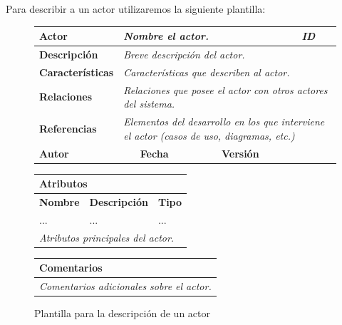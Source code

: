 \documentclass[12pt,spanish]{article}
\begin{document}
Para describir a un actor utilizaremos la siguiente plantilla: 
\begin{figure}[H]
\centering
\begin{tabular}{|m{3cm}|m{4cm}|m{2cm}|m{2cm}|m{2cm}|m{1cm}|}
\hline
\textbf{Actor} &  \multicolumn{4}{m{8cm}|}{\textit{Nombre el actor.}} &  \cellcolor{gray!40}\textit{ID} \\
\hline
\textbf{Descripción} & \multicolumn{5}{m{8cm}|}{\textit{Breve descripción del actor.}} \\
\hline
\textbf{Características} & \multicolumn{5}{m{8cm}|}{\textit{Características que describen al actor.}} \\
\hline
\textbf{Relaciones} &\multicolumn{5}{m{8cm}|}{\textit{Relaciones que posee el actor con otros actores del sistema.}} \\
\hline
\textbf{Referencias} & \multicolumn{5}{m{8cm}|}{\textit{Elementos del desarrollo en los que interviene el actor (casos de uso, diagramas, etc.)}} \\
\hline
\textbf{Autor} &  & \textbf{Fecha} &  & \textbf{Versión} &  \\
\hline
\end{tabular}

\vspace{0.5cm}

\begin{tabular}{|m{4cm}|m{7.3cm}|m{4cm}|}
\hline
\multicolumn{3}{|m{15.3cm}|}{\textbf{Atributos}} \\
\hline
\textbf{Nombre} & \textbf{Descripción} & \textbf{Tipo} \\
 \hline
... & ... & ... \\
\hline
\multicolumn{3}{|m{15.3cm}|}{\textit{Atributos principales del actor.}} \\
\hline
\end{tabular}

\vspace{0.5cm}

\begin{tabular}{|m{16.2cm}|}
\hline
\textbf{Comentarios} \\
\hline
\textit{Comentarios adicionales sobre el actor.} \\
\hline
\end{tabular}

\caption{Plantilla para la descripción de un actor}

\end{figure}
\end{document}
